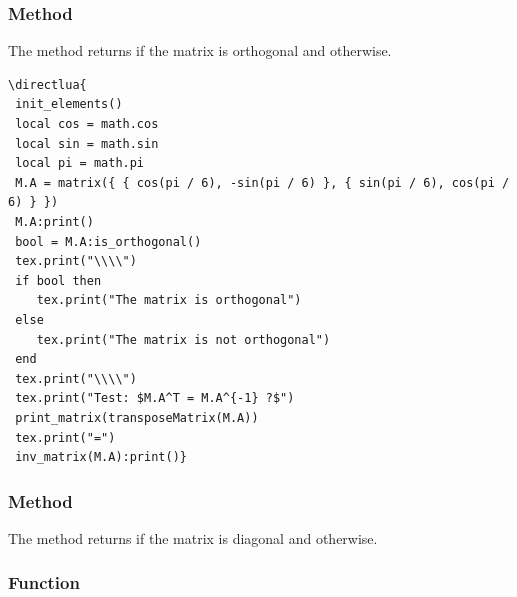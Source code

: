 \subsubsection{Method  }
\label{ssub:method_is_orthogonal}

The method returns  if the matrix is orthogonal and  otherwise.

\begin{verbatim}
\directlua{
 init_elements()
 local cos = math.cos
 local sin = math.sin
 local pi = math.pi
 M.A = matrix({ { cos(pi / 6), -sin(pi / 6) }, { sin(pi / 6), cos(pi / 6) } })
 M.A:print()
 bool = M.A:is_orthogonal()
 tex.print("\\\\")
 if bool then
 	tex.print("The matrix is orthogonal")
 else
 	tex.print("The matrix is not orthogonal")
 end
 tex.print("\\\\")
 tex.print("Test: $M.A^T = M.A^{-1} ?$")
 print_matrix(transposeMatrix(M.A))
 tex.print("=")
 inv_matrix(M.A):print()}
\end{verbatim}


\subsubsection{Method }
\label{ssub:method_is_diagonal}

The method returns  if the matrix is diagonal and  otherwise.

\subsubsection{Function }
\label{ssub:display_a_table_or_array_function_code_print_array}

